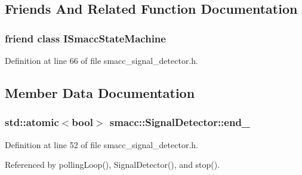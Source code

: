 \subsection{Friends And Related Function Documentation}
\subsubsection[{\texorpdfstring{I\+Smacc\+State\+Machine}{ISmaccStateMachine}}]{\setlength{\rightskip}{0pt plus 5cm}friend class {\bf I\+Smacc\+State\+Machine}\hspace{0.3cm}{\ttfamily [friend]}}\hypertarget{classsmacc_1_1SignalDetector_a0e71d23a61c07d55f419d02237d03b6a}{}\label{classsmacc_1_1SignalDetector_a0e71d23a61c07d55f419d02237d03b6a}


Definition at line 66 of file smacc\+\_\+signal\+\_\+detector.\+h.



\subsection{Member Data Documentation}
\subsubsection[{\texorpdfstring{end\+\_\+}{end_}}]{\setlength{\rightskip}{0pt plus 5cm}std\+::atomic$<${\bf bool}$>$ smacc\+::\+Signal\+Detector\+::end\+\_\+\hspace{0.3cm}{\ttfamily [private]}}\hypertarget{classsmacc_1_1SignalDetector_aaee266393c01693528a2d74b1f2354a2}{}\label{classsmacc_1_1SignalDetector_aaee266393c01693528a2d74b1f2354a2}


Definition at line 52 of file smacc\+\_\+signal\+\_\+detector.\+h.



Referenced by polling\+Loop(), Signal\+Detector(), and stop().

